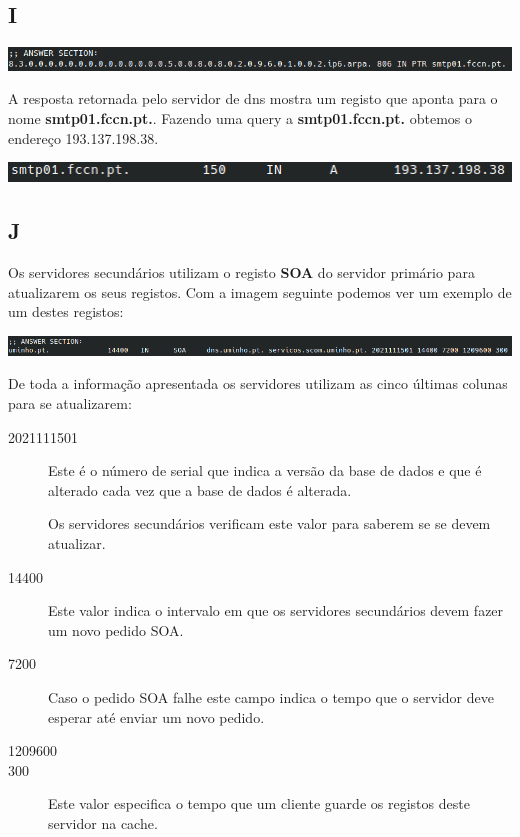\documentclass{report}
\begin{document}
        \subsection*{I}
            \noindent
            \includegraphics[width=\textwidth]{images/dig_ipv6.png}
            \par
            A resposta retornada pelo servidor de dns mostra um registo que aponta para o nome \textbf{smtp01.fccn.pt.}.
            Fazendo uma query a \textbf{smtp01.fccn.pt.} obtemos o endereço 193.137.198.38.
            \par
            \noindent
            \includegraphics[width=\textwidth]{images/dig_smtp01.png}
            \par
        \subsection*{J}
            Os servidores secundários utilizam o registo \textbf{SOA} do servidor primário para atualizarem os seus registos. 
            Com a imagem seguinte podemos ver um exemplo de um destes registos: 
            \vspace{0.45em}
            \par
            \noindent
            \includegraphics[width=\textwidth]{images/uminho_soa.png}
            \par
            \vspace{0.45em}
            De toda a informação apresentada os servidores utilizam as cinco últimas colunas para se atualizarem:
            \begin{description}
                \item[2021111501] Este é o número de serial que indica a versão da base de dados e que é alterado cada vez que a base de dados é alterada. 
                \par Os servidores secundários verificam este valor para saberem se se devem atualizar.
                \item[14400] Este valor indica o intervalo em que os servidores secundários devem fazer um novo pedido SOA.
                \item[7200] Caso o pedido SOA falhe este campo indica o tempo que o servidor deve esperar até enviar um novo pedido.
                \item[1209600] 
                \item[300] Este valor especifica o tempo que um cliente guarde os registos deste servidor na cache. 
            \end{description}
\end{document}
